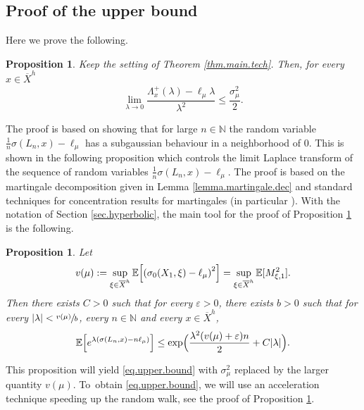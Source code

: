 \documentclass[JEP,XML,SOM,Unicode,published]{cedram}
\let\epsilon\varepsilon
\theoremstyle{plain}
\newtheorem{proposition}[theorem]{Proposition}
\theoremstyle{definition}
\newcommand\E{\mathbb{E}}
\newcommand\N{\mathbb{N}}
\begin{document}
\subsection{Proof of the upper bound} \label{subsec.upper.bound}
Here we prove the following.
\begin{proposition}\label{prop.upper.bound}
Keep the setting of Theorem \ref{thm.main.tech}. Then, for every $x \in \overline{X}^h$ \begin{equation}\label{eq.upper.bound}\lim_{\lambda \to 0} \frac{\Lambda_x^+(\lambda)-\ell_\mu \lambda }{\lambda^2} \leq \frac{\sigma^2_{\mu}}{2}.\end{equation}
\end{proposition}
The proof is based on showing that for large $n\in \N$ the random variable \hbox{$\frac{1}{n}\sigma(L_n,x)- \ell_\mu$} has a subgaussian behaviour in a neighborhood of $0$. This is shown in the following proposition which controls the limit Laplace transform of the sequence of random variables $ \frac{1}{n}\sigma(L_n,x) - \ell_\mu$. The proof is based on the martingale decomposition given in Lemma \ref{lemma.martingale.dec} and standard techniques for concentration results for martingales (in particular \cite[Th.\,2.19]{wainwright}). With the notation of Section \ref{sec.hyperbolic}, the main tool for the proof of Proposition \ref{prop.upper.bound} is the following.
\begin{proposition}\label{proposition.laplace.control}
Let \begin{equation}\label{eq.vmu}
v(\mu):=\sup_{\xi\in \overline{X}^h}{\E\Bigl[\left(\sigma_0(X_1,\xi)-\ell_\mu\right)^2 \Bigr]}=\sup_{\xi\in \overline{X}^h}{\E[M_{\xi,1}^2]}.
\end{equation}
Then there exists $C>0$ such that for every $\epsilon>0$, there exists $b>0$ such that for every $|\lambda|<\sfrac{v(\mu)}{b}$, every $n\in \N$ and every $x\in \overline{X}^h$,
\begin{equation}\label{eq.laplace.control}\E\Bigl[e^{\lambda (\sigma(L_n,x) - n \ell_\mu)}\Bigr] \leq \exp\Bigl(\frac{\lambda^2 (v(\mu)+\epsilon) n}{2}+ C |\lambda|\Bigr).\end{equation}
\end{proposition}

This proposition will yield \eqref{eq.upper.bound} with $\sigma_\mu^2$ replaced by the larger quantity $v(\mu)$. To~obtain \eqref{eq.upper.bound}, we will use an acceleration technique speeding up the random walk, see the proof of Proposition \ref{prop.upper.bound}.
\end{document}
